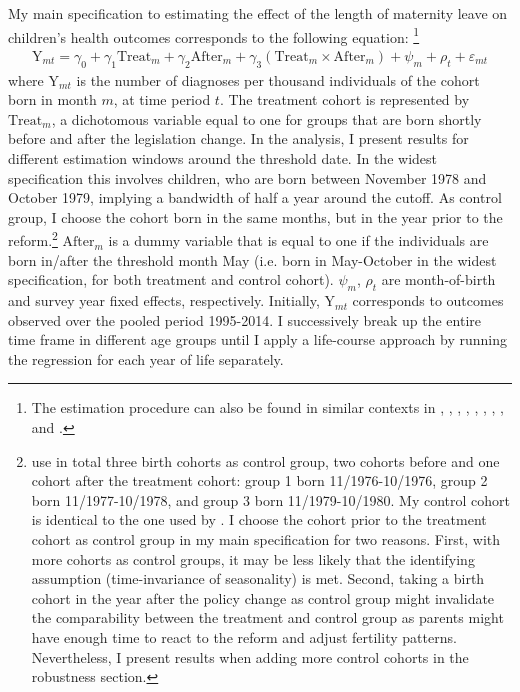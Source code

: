 \documentclass[11pt, a4paper]{article} %
\begin{document}
My main specification to estimating the effect of the length of maternity leave on children's health outcomes corresponds to the following equation: \footnote{The estimation procedure can also be found in similar contexts in \cite{RafaelLaliveandJosefZweimuller2009}, \cite{Dustmann2012}, \cite{Ekberg2013parental}, \cite{schonberg2014expansions}, \cite{Lalive2014}, \cite{Huebener2017}, \cite{danzer2017}, \cite{guertzgen2018}, and \cite{avdic2018modern}.}
\begin{align}
\text{Y}_{mt} = \gamma_0 + \gamma_1 \text{Treat}_{m} + \gamma_2 \text{After}_{m} + \gamma_3 (\text{Treat}_{m} \times \text{After}_{m}) + \psi_m + \rho_t + \varepsilon_{mt} \label{eq:DD_basline}
\end{align}
where $\text{Y}_{mt}$ is the number of diagnoses per thousand individuals of the cohort born in month $m$, at time period $t$. The treatment cohort is represented by $\text{Treat}_{m}$, a dichotomous variable equal to one for groups that are born shortly before and after the legislation change. In the analysis, I present results for different estimation windows around the threshold date. In the widest specification this involves children, who are born between November 1978 and October 1979, implying a bandwidth of half a year around the cutoff. As control group, I choose the cohort born in the same months, but in the year prior to the reform.\footnote{\cite{Dustmann2012} use in total three birth cohorts as control group, two cohorts before and one cohort after the treatment cohort: group 1 born 11/1976-10/1976, group 2 born 11/1977-10/1978, and group 3 born 11/1979-10/1980. My control cohort is identical to the one used by \cite{guertzgen2018}. \newline I choose the cohort prior to the treatment cohort as control group in my main specification for two reasons. First, with more cohorts as control groups, it may be less likely that the identifying assumption (time-invariance of seasonality) is met. Second, taking a birth cohort in the year after the policy change as control group might invalidate the comparability between the treatment and control group as parents might have enough time to react to the reform and adjust fertility patterns. Nevertheless, I present results when adding more control cohorts in the robustness section.} $\text{After}_{m}$ is a dummy variable that is equal to one if the individuals are born in/after the threshold month May (i.e. born in May-October in the widest specification, for both treatment and control cohort). $\psi_m$, $\rho_t$ are month-of-birth and survey year fixed effects, respectively. Initially, $\text{Y}_{mt}$ corresponds to outcomes observed over the pooled period 1995-2014. I successively break up the entire time frame in different age groups until I apply a life-course approach by running the regression for each year of life separately.\newline 
\end{document}
